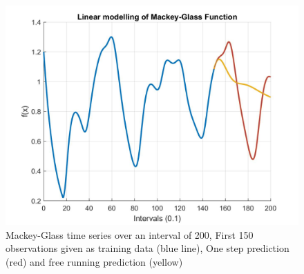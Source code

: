 \documentclass[a4paper,10pt, twocolumn]{article}
\begin{document}
\begin{figure}[ht]
	\includegraphics[width=0.9\linewidth]{mackeyGlass.jpg}
	\centering
	\caption{Mackey-Glass time series over an interval of 200, First 150 observations given as training data (blue line), One step prediction (red) and free running prediction (yellow)}
		\label{fig:Mackey-Glass}
\end{figure}
\end{document}
